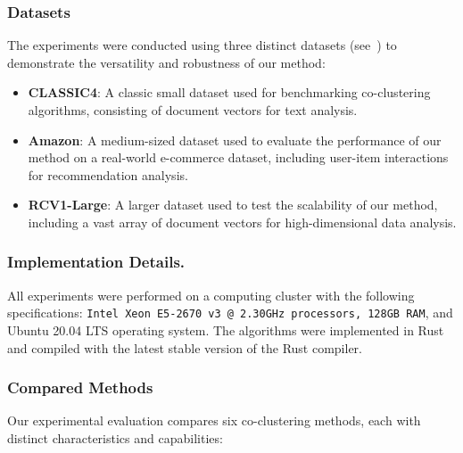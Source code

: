 \documentclass[journal]{IEEEtran}
\begin{document}
\subsubsection{Datasets}
The experiments were conducted using three distinct datasets (see~) to demonstrate the versatility and robustness of our method:
\begin{itemize}
    \item \textbf{CLASSIC4}: A classic small dataset used for benchmarking co-clustering algorithms, consisting of document vectors for text analysis.
    \item \textbf{Amazon}: A medium-sized dataset used to evaluate the performance of our method on a real-world e-commerce dataset, including user-item interactions for recommendation analysis.
    \item \textbf{RCV1-Large}: A larger dataset used to test the scalability of our method, including a vast array of document vectors for high-dimensional data analysis.
\end{itemize}

\subsubsection{Implementation Details.}
All experiments were performed on a computing cluster with the following specifications: \texttt{Intel Xeon E5-2670 v3 @ 2.30GHz processors, 128GB RAM}, and Ubuntu 20.04 LTS operating system. The algorithms were implemented in Rust and compiled with the latest stable version of the Rust compiler.

\subsubsection{Compared Methods}
Our experimental evaluation compares six co-clustering methods, each with distinct characteristics and capabilities:
\end{document}
